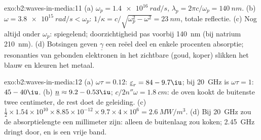 \begin{solution}{exo:b2:waves-in-media:11}
(a) $\omega_p = \qty{1.4e16}{rad/s}$,
$\lambda_p = 2\pi c/\omega_p = \qty{140}{nm}$. (b)
$\omega = \qty{3.8e15}{rad/s}
< \omega_p$:
$1/\kappa = c/\sqrt{\omega_p^2 - \omega^2} = \qty{23}{nm}$, totale
reflectie. (c) Nog altijd onder $\omega_p$: spiegelend; doorzichtigheid pas
voorbij \qty{140}{nm} (bij natrium \qty{210}{nm}). (d) Botsingen geven
$\underline\gamma$ een reëel deel en enkele procenten absorptie; resonanties
van gebonden elektronen in het zichtbare (goud, koper) slikken het blauw en
kleuren het metaal.
\end{solution}

\begin{solution}{exo:b2:waves-in-media:12}
(a) $\omega\tau = 0.12$: $\underline\varepsilon_r = 84 - 9.7\iu$; bij
\qty{20}{GHz} is $\omega\tau = 1$: $45 - 40\iu$. (b)
$\underline n \approx 9.2 - 0.53\iu$; $c/2n''\omega = \qty{1.8}{cm}$: de
oven kookt de buitenste twee centimeter, de rest doet de geleiding. (c)
$\tfrac12 \times
1.54 \times 10^{10} \times 8.85 \times 10^{-12} \times 9.7 \times 4 \times 10^6 = \qty{2.6}{MW/m^3}$.
(d) Bij \qty{20}{GHz} zou de absorptielengte een millimeter zijn: alleen de
buitenlaag zou koken; \qty{2.45}{GHz} dringt door, en is een vrije band.
\end{solution}

